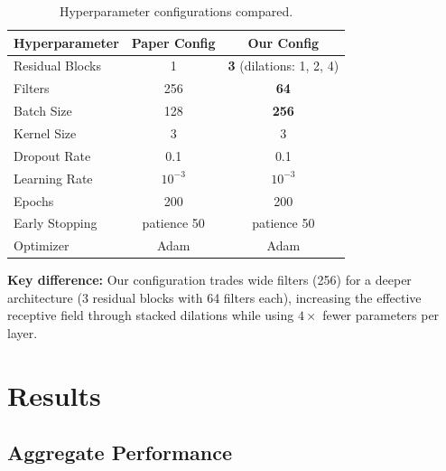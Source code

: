 \documentclass[11pt, a4paper]{article}
\begin{document}
\begin{table}[H]
\centering
\caption{Hyperparameter configurations compared.}
\label{tab:configs}
\begin{tabular}{lcc}
\toprule
\textbf{Hyperparameter} & \textbf{Paper Config} & \textbf{Our Config} \\
\midrule
Residual Blocks     & 1            & \textbf{3} (dilations: 1, 2, 4) \\
Filters             & 256          & \textbf{64} \\
Batch Size          & 128          & \textbf{256} \\
Kernel Size         & 3            & 3 \\
Dropout Rate        & 0.1          & 0.1 \\
Learning Rate       & $10^{-3}$    & $10^{-3}$ \\
Epochs              & 200          & 200 \\
Early Stopping      & patience 50  & patience 50 \\
Optimizer           & Adam         & Adam \\
\bottomrule
\end{tabular}
\end{table}

\noindent\textbf{Key difference:} Our configuration trades wide filters (256) for a deeper architecture (3 residual blocks with 64 filters each), increasing the effective receptive field through stacked dilations while using $4\times$ fewer parameters per layer.

\section{Results}

\subsection{Aggregate Performance}
\end{document}

